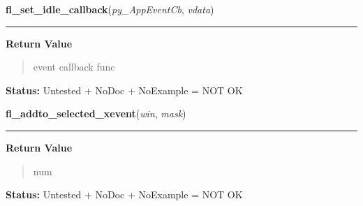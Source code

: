 \hspace{.8\funcindent}\begin{boxedminipage}{\funcwidth}

    \raggedright \textbf{fl\_set\_idle\_callback}(\textit{py\_AppEventCb}, \textit{vdata})

    \vspace{-1.5ex}

    \rule{\textwidth}{0.5\fboxrule}
\setlength{\parskip}{2ex}
\setlength{\parskip}{1ex}
      \textbf{Return Value}
    \vspace{-1ex}

      \begin{quote}
      event callback func

      \end{quote}

\textbf{Status:} Untested + NoDoc + NoExample = NOT OK



    \end{boxedminipage}

    \label{xformslib:library:fl_addto_selected_xevent}

    \vspace{0.5ex}

\hspace{.8\funcindent}\begin{boxedminipage}{\funcwidth}

    \raggedright \textbf{fl\_addto\_selected\_xevent}(\textit{win}, \textit{mask})

    \vspace{-1.5ex}

    \rule{\textwidth}{0.5\fboxrule}
\setlength{\parskip}{2ex}
\setlength{\parskip}{1ex}
      \textbf{Return Value}
    \vspace{-1ex}

      \begin{quote}
      num

      \end{quote}

\textbf{Status:} Untested + NoDoc + NoExample = NOT OK



    \end{boxedminipage}

    \label{xformslib:library:fl_remove_selected_xevent}

